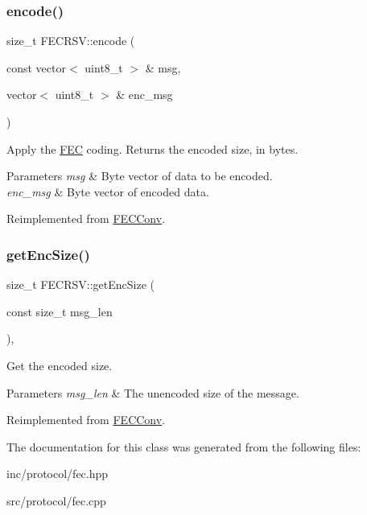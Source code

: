 \subsubsection{\texorpdfstring{encode()}{encode()}}
{\footnotesize\ttfamily size\+\_\+t F\+E\+C\+R\+S\+V\+::encode (\begin{DoxyParamCaption}\item[{const vector$<$ uint8\+\_\+t $>$ \&}]{msg,  }\item[{vector$<$ uint8\+\_\+t $>$ \&}]{enc\+\_\+msg }\end{DoxyParamCaption})\hspace{0.3cm}{\ttfamily [virtual]}}

Apply the \hyperlink{classFEC}{F\+EC} coding. Returns the encoded size, in bytes. 
\begin{DoxyParams}{Parameters}
{\em msg} & Byte vector of data to be encoded. \\
\hline
{\em enc\+\_\+msg} & Byte vector of encoded data. \\
\hline
\end{DoxyParams}


Reimplemented from \hyperlink{classFECConv_ae3e796d0e026dca718ed6384653a4564}{F\+E\+C\+Conv}.

\mbox{\label{classFECRSV_a62fb01c152dad2e043ae75bbacfd928c}} 
\subsubsection{\texorpdfstring{get\+Enc\+Size()}{getEncSize()}}
{\footnotesize\ttfamily size\+\_\+t F\+E\+C\+R\+S\+V\+::get\+Enc\+Size (\begin{DoxyParamCaption}\item[{const size\+\_\+t}]{msg\+\_\+len }\end{DoxyParamCaption})\hspace{0.3cm}{\ttfamily [inline]}, {\ttfamily [virtual]}}

Get the encoded size. 
\begin{DoxyParams}{Parameters}
{\em msg\+\_\+len} & The unencoded size of the message. \\
\hline
\end{DoxyParams}


Reimplemented from \hyperlink{classFECConv_a3b49acf69440d2677e3181513b9f3592}{F\+E\+C\+Conv}.



The documentation for this class was generated from the following files\+:\begin{DoxyCompactItemize}
\item 
inc/protocol/fec.\+hpp\item 
src/protocol/fec.\+cpp\end{DoxyCompactItemize}
